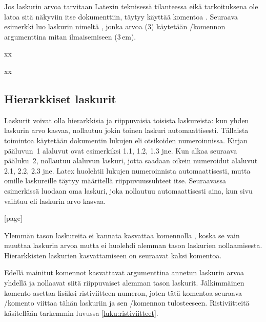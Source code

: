 Jos laskurin arvoa tarvitaan Latexin teknisessä tilanteessa eikä
tarkoituksena ole latoa sitä näkyviin itse dokumenttiin, täytyy käyttää
komentoa . Seuraava esimerkki luo laskurin nimeltä
, jonka arvoa (3) käytetään \-/komennon
argumenttina mitan ilmaisemiseen (3\,em).

\pagebreak[3]

\begin{koodilohkosis}
  \setcounter{mitta}{3}
  xx
\end{koodilohkosis}

\begin{tulossis}
  x\hspace{3em}x
\end{tulossis}

\subsection{Hierarkkiset laskurit}

Laskurit voivat olla hierarkkisia ja riippuvaisia toisista laskureista:
kun yhden laskurin arvo kasvaa, nollautuu jokin toinen laskuri
automaattisesti. Tällaista toimintoa käytetään dokumentin lukujen eli
otsikoiden numeroinnissa. Kirjan pääluvun~1 alaluvut ovat esimerkiksi
1.1, 1.2, 1.3 jne. Kun alkaa seuraava pääluku~2, nollautuu alaluvun
laskuri, jotta saadaan oikein numeroidut alaluvut 2.1, 2.2, 2.3 jne.
Latex huolehtii lukujen numeroinnista automaattisesti, mutta omille
laskureille täytyy määritellä riippuvuussuhteet itse. Seuraavassa
esimerkissä luodaan oma laskuri, joka nollautuu automaattisesti aina,
kun sivu vaihtuu eli laskurin  arvo kasvaa.

\begin{koodilohkosis}
  [page]
\end{koodilohkosis}

Ylemmän tason laskureita ei kannata kasvattaa komennolla , koska se vain muuttaa laskurin arvoa mutta ei
huolehdi alemman tason laskurien nollaamisesta. Hierarkkisten laskurien
kasvattamiseen on seuraavat kaksi komentoa.

\begin{koodilohkosis}
\end{koodilohkosis}

Edellä mainitut komennot kasvattavat argumenttina annetun laskurin arvoa
yhdellä ja nollaavat siitä riippuvaiset alemman tason laskurit.
Jälkimmäinen komento  asettaa lisäksi
ristiviitteen numeron, joten tätä komentoa seuraava \-/komento viittaa tähän laskuriin ja sen \-/komennon tulosteeseen. Ristiviitteitä käsitellään
tarkemmin luvussa \ref{luku:ristiviitteet}.

